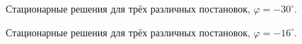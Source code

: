 \documentclass[14pt, a4paper, fleqn]{extarticle}
\begin{document}
\begin{figure}[H]
\caption{Стационарные решения для трёх различных постановок, $\varphi = -30^\circ$.}
\end{figure}


\begin{figure}[H]
\caption{Стационарные решения для трёх различных постановок, $\varphi = -16^\circ$.}
\end{figure}
\end{document}
